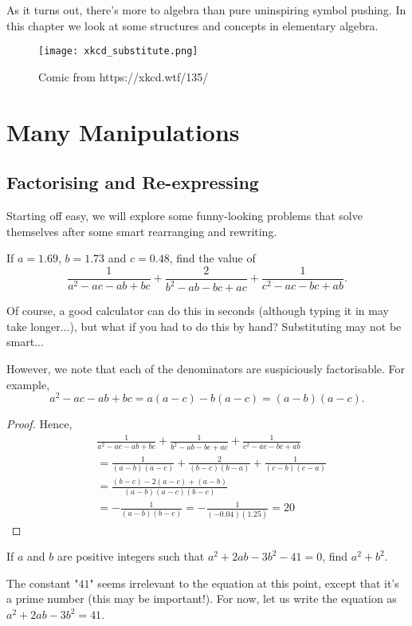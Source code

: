 \documentclass[../jarvis.tex]{subfiles}
\begin{document}
As it turns out, there's more to algebra than pure uninspiring symbol pushing. In this chapter we look at some structures and concepts in elementary algebra.

\begin{figure}[H]
    \centering
    \texttt{[image: xkcd\_substitute.png]}
    \caption{Comic from https://xkcd.wtf/135/}
\end{figure}

\section{Many Manipulations \ez}
\subsection{Factorising and Re-expressing}
Starting off easy, we will explore some funny-looking problems that solve themselves after some smart rearranging and rewriting.

\begin{example}[2013 SMO(J) P15]
    If $a=1.69$, $b=1.73$ and $c=0.48$, find the value of
    $$\frac{1}{a^2-ac-ab+bc}+\frac{2}{b^2-ab-bc+ac}+\frac{1}{c^2-ac-bc+ab}.$$
\end{example}
Of course, a good calculator can do this in seconds (although typing it in may take longer...), but what if you had to do this by hand? Substituting may not be smart...

However, we note that each of the denominators are suspiciously factorisable. For example,
$$a^2-ac-ab+bc=a(a-c)-b(a-c)=(a-b)(a-c).$$

\begin{proof}
    Hence,
\begin{align*}
    & \frac{1}{a^2-ac-ab+bc}+\frac{1}{b^2-ab-bc+ac}+\frac{1}{c^2-ac-bc+ab}\\
    &=\frac{1}{(a-b)(a-c)}+\frac{2}{(b-c)(b-a)}+\frac{1}{(c-b)(c-a)} \\
    &=\frac{(b-c)-2(a-c)+(a-b)}{(a-b)(a-c)(b-c)} \\
    &=-\frac{1}{(a-b)(b-c)} = -\frac{1}{(-0.04)(1.25)} = \boxed{20}
\end{align*}
\end{proof}


\begin{example}[2013 SMO(J) P32]
    If $a$ and $b$ are positive integers such that $a^2+2ab-3b^2-41=0$, find $a^2+b^2$.
\end{example}
The constant "$41$" seems irrelevant to the equation at this point, except that it's a prime number (this may be important!). For now, let us write the equation as $a^2+2ab-3b^2=41$.
\end{document}
